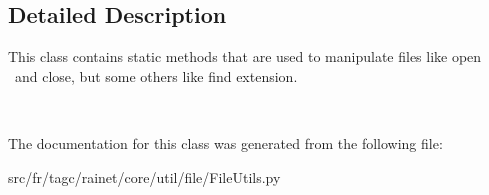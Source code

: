 \subsection{Detailed Description}
This class contains static methods that are used to manipulate files like open  and close, but some others like find extension. 

  

The documentation for this class was generated from the following file\+:\begin{DoxyCompactItemize}
\item 
src/fr/tagc/rainet/core/util/file/File\+Utils.\+py\end{DoxyCompactItemize}
